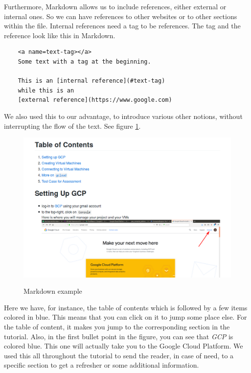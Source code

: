Furthermore, Markdown allows us to include references, either external
or internal ones. So we can have references to other websites or to
other sections within the file. Internal references need a tag to be
references. The tag and the reference look like this in Markdown.

\begin{verbatim}
	<a name=text-tag></a>
	Some text with a tag at the beginning.

	This is an [internal reference](#text-tag)
	while this is an
	[external reference](https://www.google.com)
\end{verbatim}

We also used this to our advantage,
to introduce various other notions, without interrupting the flow of
the text. See figure \ref{fig:markdown}.

\begin{figure}
	\centering
	\includegraphics[width=.5\textwidth]{Images/markdown-showcase.png}
	\label{fig:markdown}
	\caption{Markdown example}
\end{figure}

Here we have, for instance, the table of contents which is followed by
a few items colored in blue. This means that you can click on it to
jump some place else. For the table of content, it makes you jump to
the corresponding section in the tutorial. Also, in the first bullet
point in the figure, you can see that \textit{GCP} is colored blue.
This one will actually take you to the Google Cloud Platform.  We used
this all throughout the tutorial to send the reader, in case of need,
to a specific section to get a refresher or some additional
information.
